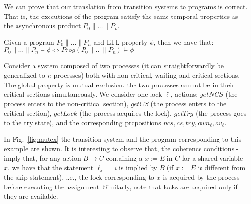 We can prove that our translation from transition systems to programs is correct. That is, the executions of the program satisfy the same temporal properties as the 
asynchronous product $P_0 \parallel \dots \parallel P_n$.
\begin{theorem}\label{th:proppreservation} Given a program $P_0 \parallel \dots \parallel P_n$ and \textsf{LTL} property $\phi$, then we have that:
$
	P_0 \parallel \dots \parallel P_n \vDash \phi \Leftrightarrow Prog(P_0 \parallel \dots \parallel P_n) \vDash \phi
$
\end{theorem}
\begin{example}[Mutex]  
\label{ex:mutex-ts}
Consider a system composed of two processes (it can straightforwardly be generalized to $n$ processes) both with non-critical, waiting and critical sections. The global property  is mutual exclusion: the two processes cannot be in their critical sections simultaneously. We consider one lock $\ell$, actions: $\mathit{getNCS}$ (the process enters to the non-critical section), $\mathit{getCS}$ (the process enters to the critical section), $\mathit{getLock}$ (the process acquires the lock), $\mathit{getTry}$ (the process goes to the try state), and the corresponding propositions $\mathit{ncs}, \mathit{cs}, \mathit{try}, \mathit{own}_\ell, \mathit{av}_\ell$.  

In Fig.~\ref{fig:mutex} the transition system and the program corresponding to this example are shown. It is interesting to observe that,  the coherence conditions - imply that, for any action $B \rightarrow C$  containing a $x := E$ in $C$ for a shared variable $x$, we have that the statement $\ell_x=i$ is implied by $B$ (if $x:=E$ is different from the skip statement), i.e., the lock corresponding to $x$ is acquired by the process before executing the assignment. Similarly, note that locks are acquired only if they are available.
\end{example}
